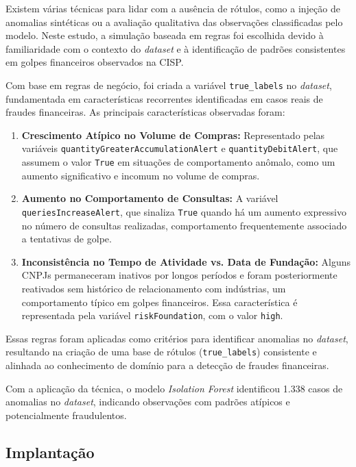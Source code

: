 \documentclass[12pt,a4paper]{article}
\begin{document}
Existem várias técnicas para lidar com a ausência de rótulos, como a injeção de anomalias sintéticas ou a avaliação qualitativa das observações classificadas pelo modelo. Neste estudo, a simulação baseada em regras foi escolhida devido à familiaridade com o contexto do \textit{dataset} e à identificação de padrões consistentes em golpes financeiros observados na CISP.

Com base em regras de negócio, foi criada a variável \texttt{true\_labels} no \textit{dataset}, fundamentada em características recorrentes identificadas em casos reais de fraudes financeiras. As principais características observadas foram:

\begin{enumerate}
    \item \textbf{Crescimento Atípico no Volume de Compras:} Representado pelas variáveis \texttt{quantityGreaterAccumulationAlert} e \texttt{quantityDebitAlert}, que assumem o valor \texttt{True} em situações de comportamento anômalo, como um aumento significativo e incomum no volume de compras.

    \item \textbf{Aumento no Comportamento de Consultas:} A variável \texttt{queriesIncreaseAlert}, que sinaliza \texttt{True} quando há um aumento expressivo no número de consultas realizadas, comportamento frequentemente associado a tentativas de golpe.

    \item \textbf{Inconsistência no Tempo de Atividade vs. Data de Fundação:} Alguns CNPJs permaneceram inativos por longos períodos e foram posteriormente reativados sem histórico de relacionamento com indústrias, um comportamento típico em golpes financeiros. Essa característica é representada pela variável \texttt{riskFoundation}, com o valor \texttt{high}.
\end{enumerate}

Essas regras foram aplicadas como critérios para identificar anomalias no \textit{dataset}, resultando na criação de uma base de rótulos (\texttt{true\_labels}) consistente e alinhada ao conhecimento de domínio para a detecção de fraudes financeiras.

Com a aplicação da técnica, o modelo \textit{Isolation Forest} identificou 1.338 casos de anomalias no \textit{dataset}, indicando observações com padrões atípicos e potencialmente fraudulentos.

\subsection{Implantação}
\end{document}
